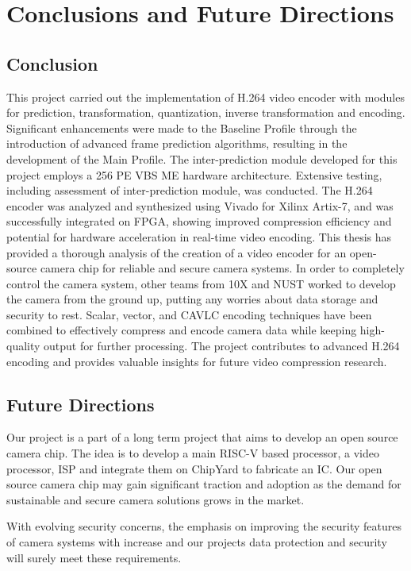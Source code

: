
\chapter{Conclusions and Future Directions} %
\label{Chapter6}
\section{Conclusion}
This project carried out the implementation of H.264 video encoder with modules for prediction, transformation, quantization, inverse transformation and encoding.  Significant enhancements were made to the Baseline Profile through the introduction of advanced frame prediction algorithms, resulting in the development of the Main Profile. The inter-prediction module developed for this project employs a 256 PE VBS ME hardware architecture. Extensive testing, including assessment of inter-prediction module, was conducted. The H.264 encoder was analyzed and synthesized using Vivado for Xilinx Artix-7, and was successfully integrated on FPGA, showing improved compression efficiency and potential for hardware acceleration in real-time video encoding. This thesis has provided a thorough analysis of the creation of a video encoder for an open-source camera chip for reliable and secure camera systems. In order to completely control the camera system, other teams from 10X and NUST worked to develop the camera from the ground up, putting any worries about data storage and security to rest. Scalar, vector, and CAVLC encoding techniques have been combined to effectively compress and encode camera data while keeping high-quality output for further processing. The project contributes to advanced H.264 encoding and provides valuable insights for future video compression research.
\section{Future Directions}
Our project is a part of a long term project that aims to develop an open source camera chip. The idea is to develop a main RISC-V based processor, a video processor, ISP and integrate them on ChipYard to fabricate an IC. Our open source camera chip may gain significant traction and adoption as the demand for sustainable and secure camera solutions grows in the market.

With evolving security concerns, the emphasis on improving the security features of camera systems with increase and our projects data protection and security will surely meet these requirements.

